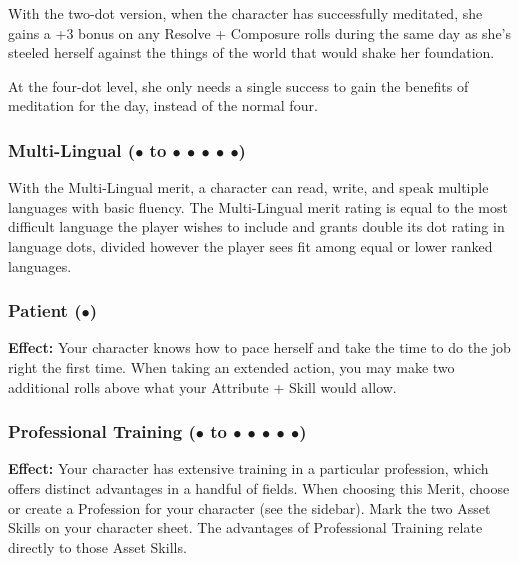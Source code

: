 \documentclass["../Misguided by Starlight.tex"]{subfiles}
\begin{document}
		With the two-dot version, when the character has successfully meditated, she gains a +3 bonus on any Resolve + Composure rolls during the same day as she’s steeled herself against the things of the world that would shake her foundation.

		At the four-dot level, she only needs a single success to gain the benefits of meditation for the day, instead of the normal four.
	
	\subsubsection{Multi-Lingual ($\bullet$ to $\bullet$ $\bullet$ $\bullet$ $\bullet$ $\bullet$)} %
		With the Multi-Lingual merit, a character can read, write, and speak multiple languages with basic fluency. The Multi-Lingual merit rating is equal to the most difficult language the player wishes to include and grants double its dot rating in language dots, divided however the player sees fit among equal or lower ranked languages.

	\subsubsection{Patient ($\bullet$)} %
		\textbf{Effect:} Your character knows how to pace herself and take the time to do the job right the first time. When taking an extended action, you may make two additional rolls above what your Attribute + Skill would allow.
	
	\subsubsection{Professional Training ($\bullet$ to $\bullet$ $\bullet$ $\bullet$ $\bullet$ $\bullet$)} %
		\textbf{Effect:} Your character has extensive training in a particular profession, which offers distinct advantages in a handful of fields. When choosing this Merit, choose or create a Profession for your character (see the sidebar). Mark the two Asset Skills on your character sheet. The advantages of Professional Training relate directly to those Asset Skills.
		
\end{document}
